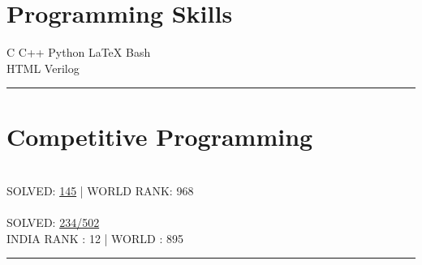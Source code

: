 \documentclass[letterpaper]{Formatting}
\begin{document}
\begin{minipage}[t]{0.3\textwidth}
\section{Programming Skills}


C \textbullet{} C++ \textbullet{} Python \textbullet{} \LaTeX \textbullet{} Bash \\
HTML \textbullet{} Verilog \\
\sectionspace %
\vspace{-1.5ex}
\rule{5cm}{0.5pt}
\vspace{2ex}


\section{Competitive Programming}
\\\vspace{0.5ex}
\small\uppercase {Solved: }\href{http://www.spoj.com/users/rbavishi/}{145} | \uppercase{World Rank: 968}\\
\vspace{2ex}
\\\vspace{0.5ex}
\small \uppercase{Solved: }\href{https://projecteuler.net/profile/RJBavishi.png}{234/502} \\
\small \uppercase{India Rank : 12 | World : 895}
\vspace{1ex}
\rule{5cm}{0.5pt}
\vspace{2ex}


\end{minipage} %
\end{document}
